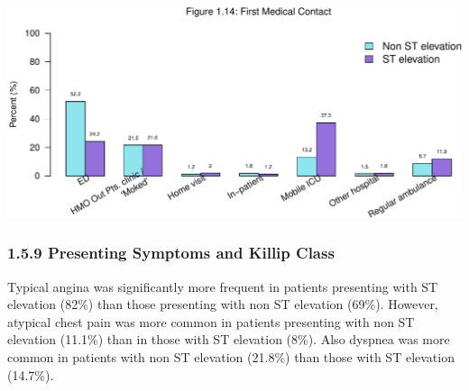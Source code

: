 \documentclass[
]{article}
\begin{document}
\includegraphics{ACSIS_2024_v1_pdf_files/figure-latex/unnamed-chunk-49-1.pdf}

\pagebreak

\subsubsection{1.5.9 Presenting Symptoms and Killip
Class}\label{presenting-symptoms-and-killip-class}

Typical angina was significantly more frequent in patients presenting
with ST elevation (82\%) than those presenting with non ST elevation
(69\%). However, atypical chest pain was more common in patients
presenting with non ST elevation (11.1\%) than in those with ST
elevation (8\%). Also dyspnea was more common in patients with non ST
elevation (21.8\%) than those with ST elevation (14.7\%).

~
\end{document}
